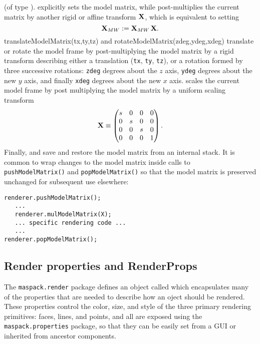 (of type ).
explicitly sets the model matrix, while
post-multiplies the current matrix by another rigid or
affine transform ${\bf X}$, which is equivalent to
setting
%
\begin{equation*}
{\bf X}_{MW} := {\bf X}_{MW} \, {\bf X}.
\end{equation*}
%
%
{translateModelMatrix(tx,ty,tz)} and
%
{rotateModelMatrix(zdeg,ydeg,xdeg)} translate or rotate the model
frame by post-multiplying the model matrix by a rigid transform
describing either a translation ({\tt tx}, {\tt ty}, {\tt tz}), or
a rotation formed by three successive rotations: {\tt zdeg} degrees
about the $z$ axis, {\tt ydeg} degrees about the new $y$ axis, and
finally {\tt xdeg} degrees about the new $x$ axis.
scales the current model frame by
post multiplying the model matrix by a uniform scaling transform
%
\begin{equation*}
{\bf X} \equiv \left(\begin{matrix}
s & 0 & 0 & 0 \\
0 & s & 0 & 0 \\
0 & 0 & s & 0 \\
0 & 0 & 0 & 1 \\
\end{matrix}\right).
\end{equation*}
%
Finally,  and
 save and
restore the model matrix from an internal stack. It is common to
wrap changes to the model matrix inside calls to {\tt
pushModelMatrix()} and {\tt popModelMatrix()} so that the model matrix
is preserved unchanged for subsequent use elsewhere:
%
\begin{lstlisting}[]
renderer.pushModelMatrix();
   ...
   renderer.mulModelMatrix(X);
   ... specific rendering code ...
   ...
renderer.popModelMatrix();
\end{lstlisting}
%

\subsection{Render properties and RenderProps}
\label{RenderProps:sec}

The {\tt maspack.render} package defines an object called
 which encapsulates many of the
properties that are needed to describe how an oject should be
rendered. These properties control the color, size, and style of the
three primary rendering primitives: faces, lines, and points, and all
are exposed using the {\tt maspack.properties}
package, so that they can be easily set from a GUI or inherited from
ancestor components.

